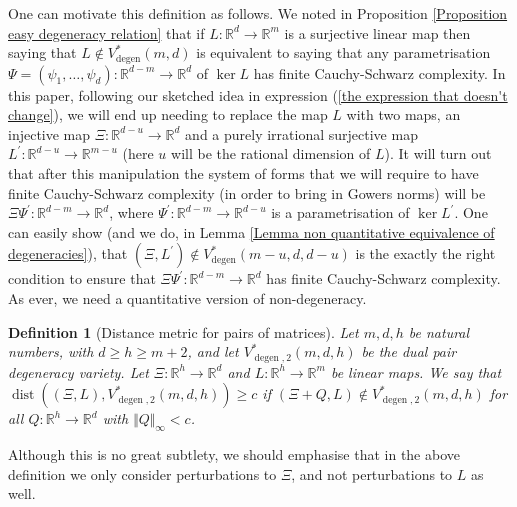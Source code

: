 \documentclass[12pt,a4paper,twoside,reqno]{amsart}
\newtheorem{Definition}[Theorem]{Definition}
\newcommand{\degen}{\operatorname{degen}}
\numberwithin{equation}{section}
\begin{document}
One can motivate this definition as follows. We noted in Proposition \ref{Proposition easy degeneracy relation} that if $L:\mathbb{R}^d \longrightarrow \mathbb{R}^m$ is a surjective linear map then saying that $ L \notin V_{\degen}^*(m,d)$ is equivalent to saying that any parametrisation $\Psi = (\psi_1,\dots,\psi_d): \mathbb{R}^{d-m} \longrightarrow \mathbb{R}^d$ of $\ker L$ has finite Cauchy-Schwarz complexity. In this paper, following our sketched idea in expression (\ref{the expression that doesn't change}), we will end up needing to replace the map $L$ with two maps, an injective map $\Xi: \mathbb{R}^{d-u} \longrightarrow \mathbb{R}^d$ and a purely irrational surjective map $L^\prime: \mathbb{R}^{d-u} \longrightarrow \mathbb{R}^{m-u}$ (here $u$ will be the rational dimension of $L$). It will turn out that after this manipulation the system of forms that we will require to have finite Cauchy-Schwarz complexity (in order to bring in Gowers norms) will be $\Xi \Psi^\prime: \mathbb{R}^{d-m} \longrightarrow \mathbb{R}^d$, where $\Psi^\prime: \mathbb{R}^{d-m} \longrightarrow \mathbb{R}^{d-u}$ is a parametrisation of $\ker L^\prime$. One can easily show (and we do, in Lemma \ref{Lemma non quantitative equivalence of degeneracies}), that $(\Xi,L^\prime) \notin V_{\degen}^*(m-u,d,d-u)$ is the exactly the right condition to ensure that $\Xi \Psi^\prime: \mathbb{R}^{d-m} \longrightarrow \mathbb{R}^d$ has finite Cauchy-Schwarz complexity. \\

As ever, we need a quantitative version of non-degeneracy. 


\begin{Definition}[Distance metric for pairs of matrices]
\label{Definition distance metric for pairs of matrices}
Let $m,d,h$ be natural numbers, with $d\geqslant h\geqslant m+2$, and let $V^*_{\degen,2}(m,d,h)$ be the dual pair degeneracy variety. Let $\Xi:\mathbb{R}^h \longrightarrow \mathbb{R}^d$ and $L:\mathbb{R}^h \longrightarrow \mathbb{R}^m$ be linear maps. We say that $\operatorname{dist}((\Xi,L),V^*_{\degen,2}(m,d,h))\geqslant c$ if $(\Xi+ Q,L)\notin V^*_{\degen,2}(m,d,h)$ for all $Q:\mathbb{R}^h \longrightarrow \mathbb{R}^{d}$ with $\Vert Q\Vert_\infty < c$. 
\end{Definition}
\noindent Although this is no great subtlety, we should emphasise that in the above definition we only consider perturbations to $\Xi$, and not perturbations to $L$ as well. \\

 
\end{document}
